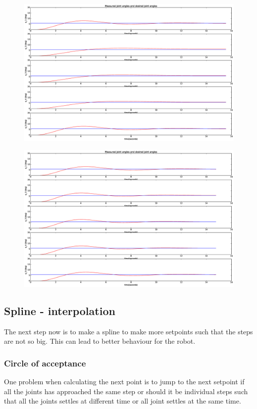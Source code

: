 \begin{figure}[htbp]
  \centering
  \includegraphics[width=.9\textwidth]{img/joingangKp1.eps}
  \caption{}
  \label{fig:testkp1}
\end{figure}
\begin{figure}[htbp]
  \centering
  \includegraphics[width=.9\textwidth]{img/joingangKp2.eps}
  \caption{}
  \label{fig:testkp2}
\end{figure}

\subsection*{Spline - interpolation}
The next step now is to make a spline to make more setpoints such that the steps are not so big. This can lead to better behaviour for the robot. 

\subsubsection*{Circle of acceptance}
One problem when calculating the next point is to jump to the next setpoint if all the joints has approached the same step or should it be individual steps such that all the joints settles at different time or all joint settles at the same time. 
